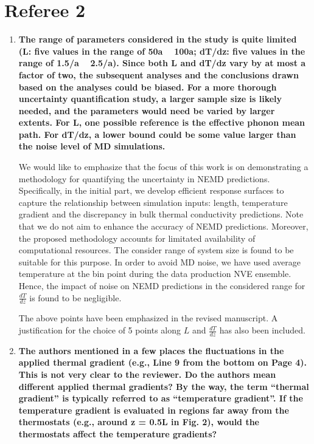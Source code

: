 \documentclass[12pt]{article}
\begin{document}
\section*{Referee 2}
\begin{enumerate}[leftmargin=*,itemsep=24pt]
\item \textbf{The range of parameters considered in the study is quite limited (L: five values in the range of 50a ~ 100a; dT/dz: five values in the range of 1.5/a ~ 2.5/a). Since both L and dT/dz vary by at most a factor of two, the subsequent analyses and the conclusions drawn based on the analyses could be biased. For a more thorough uncertainty quantification study, a larger sample size is likely needed, and the parameters would need be varied by larger extents. For L, one possible reference is the effective phonon mean path. For dT/dz, a lower bound could be some value larger than the noise level of MD simulations.}

We would like to emphasize that the focus of this work is on demonstrating a methodology for quantifying the
uncertainty in NEMD predictions. Specifically, in the initial part, we develop efficient response surfaces
to capture the relationship between simulation inputs: length, temperature gradient and the discrepancy in
bulk thermal conductivity predictions. Note that we do not aim to enhance the accuracy of NEMD predictions.
Moreover, the proposed methodology accounts for limitated availability of computational resources. The
consider range of system size is found to be suitable for this purpose. In order to avoid MD noise, we
have used average temperature at the bin point during the data production NVE ensemble. Hence, the
impact of noise on NEMD predictions in the considered range for $\frac{dT}{dz}$ is found to be negligible.

The above points have been emphasized in the revised manuscript. A justification for the choice of 5 points
along $L$ and $\frac{dT}{dz}$ has also been included.  

\item \textbf{The authors mentioned in a few places the fluctuations in the applied thermal gradient (e.g., Line 9 from the bottom on Page 4). This is not very clear to the reviewer. Do the authors mean different applied thermal gradients? By the way, the term “thermal gradient” is typically referred to as “temperature gradient”. If the temperature gradient is evaluated in regions far away from the thermostats (e.g., around z = 0.5L in Fig. 2), would the thermostats affect the temperature gradients?}


\end{enumerate}
\end{document}
